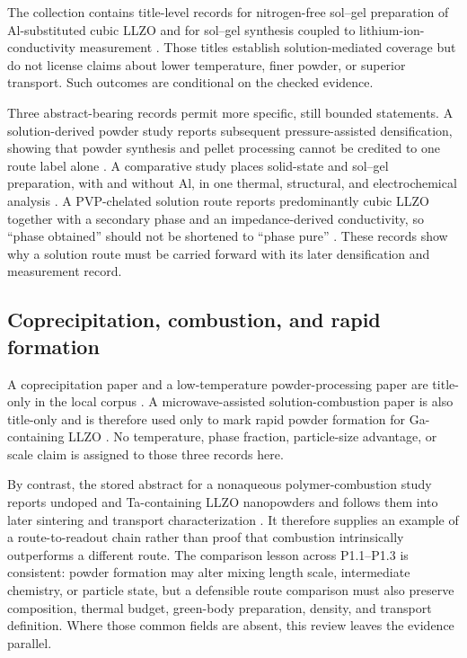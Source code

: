 The collection contains title-level records for nitrogen-free sol--gel preparation of Al-substituted cubic LLZO \cite{rosenkiewitz2015nitrogen} and for sol--gel synthesis coupled to lithium-ion-conductivity measurement \cite{kokal2011sol}. Those titles establish solution-mediated coverage but do not license claims about lower temperature, finer powder, or superior transport. Such outcomes are conditional on the checked evidence.

Three abstract-bearing records permit more specific, still bounded statements. A solution-derived powder study reports subsequent pressure-assisted densification, showing that powder synthesis and pellet processing cannot be credited to one route label alone \cite{sakamoto2013synthesis}. A comparative study places solid-state and sol--gel preparation, with and without Al, in one thermal, structural, and electrochemical analysis \cite{kosir2022comparative}. A PVP-chelated solution route reports predominantly cubic LLZO together with a secondary phase and an impedance-derived conductivity, so ``phase obtained'' should not be shortened to ``phase pure'' \cite{bae2019use}. These records show why a solution route must be carried forward with its later densification and measurement record.

\subsection{Coprecipitation, combustion, and rapid formation}

A coprecipitation paper and a low-temperature powder-processing paper are title-only in the local corpus \cite{hamao2015synthesis,padarti2018low}. A microwave-assisted solution-combustion paper is also title-only and is therefore used only to mark rapid powder formation for Ga-containing LLZO \cite{dandeneau2023rapid}. No temperature, phase fraction, particle-size advantage, or scale claim is assigned to those three records here.

By contrast, the stored abstract for a nonaqueous polymer-combustion study reports undoped and Ta-containing LLZO nanopowders and follows them into later sintering and transport characterization \cite{weller2019nonaqueous}. It therefore supplies an example of a route-to-readout chain rather than proof that combustion intrinsically outperforms a different route. The comparison lesson across P1.1--P1.3 is consistent: powder formation may alter mixing length scale, intermediate chemistry, or particle state, but a defensible route comparison must also preserve composition, thermal budget, green-body preparation, density, and transport definition. Where those common fields are absent, this review leaves the evidence parallel.

